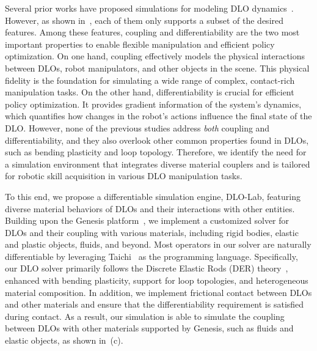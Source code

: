 Several prior works have proposed simulations for modeling DLO dynamics~\citep{lin2021softgym,naughton2021elastica,li2021codimensional,tong2023fully,chendifferentiable,jiang2025phystwin}. However, as shown in~, each of them only supports a subset of the desired features. Among these features, coupling and differentiability are the two most important properties to enable flexible manipulation and efficient policy optimization. 
On one hand, coupling effectively models the physical interactions between DLOs, robot manipulators, and other objects in the scene. This physical fidelity is the foundation for simulating a wide range of complex, contact-rich manipulation tasks.
On the other hand, differentiability is crucial for efficient policy optimization. It provides gradient information of the system's dynamics, which quantifies how changes in the robot's actions influence the final state of the DLO.
However, none of the previous studies address \emph{both} coupling and differentiability, and they also overlook other common properties found in DLOs, such as bending plasticity and loop topology.
Therefore, we identify the need for a simulation environment that integrates diverse material couplers and is tailored for robotic skill acquisition in various DLO manipulation tasks.

To this end, we propose a differentiable simulation engine, DLO-Lab, featuring diverse material behaviors of DLOs and their interactions with other entities. Building upon the Genesis platform~\citep{Genesis}, we implement a customized solver for DLOs and their coupling with various materials, including rigid bodies, elastic and plastic objects, fluids, and beyond. Most operators in our solver are naturally differentiable by leveraging Taichi~\citep{hu2019taichi,hu2020difftaichi} as the programming language. Specifically, our DLO solver primarily follows the Discrete Elastic Rods (DER) theory~\citep {bergou2008discrete,bergou2010discrete}, enhanced with bending plasticity, support for loop topologies, and heterogeneous material composition. In addition, we implement frictional contact between DLOs and other materials and ensure that the differentiability requirement is satisfied during contact. As a result, our simulation is able to simulate the coupling between DLOs with other materials supported by Genesis, such as fluids and elastic objects, as shown in~(c).

